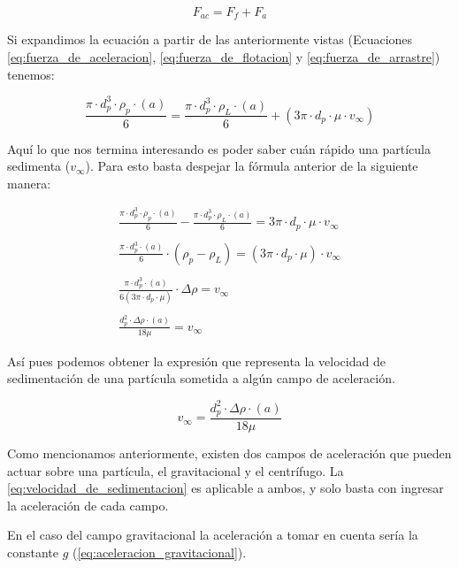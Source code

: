 \documentclass{AsignaturaResumen}
\begin{document}
\begin{equation}\label{eq:ley_de_stokes}
    F_{ac} = F_{f} + F_{a}
\end{equation}

Si expandimos la ecuación a partir de las anteriormente vistas (Ecuaciones \ref{eq:fuerza_de_aceleracion}, \ref{eq:fuerza_de_flotacion} y \ref{eq:fuerza_de_arrastre}) tenemos:

\begin{equation}\label{eq:ley_de_stokes_expandida}
    \frac{\pi \cdot d_{p}^{3}\cdot\rho_{p}\cdot(a)}{6} = \frac{\pi\cdot d_{p}^{3} \cdot\rho_{L}\cdot(a)}{6} + (3\pi\cdot d_{p}\cdot\mu\cdot v_{\infty})
\end{equation}

Aquí lo que nos termina interesando es poder saber cuán rápido una partícula sedimenta ($v_{\infty}$). Para esto basta despejar la fórmula anterior de la siguiente manera:

\begin{gather*}
    \frac{\pi\cdot d_{p}^{3}\cdot\rho_{p}\cdot(a)}{6} - \frac{\pi\cdot d_{p}^{3}\cdot\rho_{L}\cdot(a)}{6} = 3\pi\cdot d_{p} \cdot\mu\cdot v_{\infty}
    \\\\
    \frac{\pi\cdot d_{p}^{3}\cdot(a)}{6} \cdot (\rho_{p}-\rho_{L}) = (3\pi\cdot d_{p}\cdot\mu)\cdot v_{\infty}
    \\\\
    \frac{\pi\cdot d_{p}^{3}\cdot(a)}{6(3\pi\cdot d_{p}\cdot\mu)} \cdot \Delta\rho =  v_{\infty}
    \\\\
    \frac{d_{p}^{2}\cdot\Delta\rho\cdot(a)}{18\mu} = v_{\infty}
\end{gather*}

Así pues podemos obtener la expresión que representa la velocidad de sedimentación de una partícula sometida a algún campo de aceleración.

\begin{equation}\label{eq:velocidad_de_sedimentacion}
    v_{\infty} = \frac{d_{p}^{2}\cdot\Delta\rho\cdot(a)}{18\mu}
\end{equation}

Como mencionamos anteriormente, existen dos campos de aceleración que pueden actuar sobre una partícula, el gravitacional y el centrífugo. La \autoref{eq:velocidad_de_sedimentacion} es aplicable a ambos, y solo basta con ingresar la aceleración de cada campo.

En el caso del campo gravitacional la aceleración a tomar en cuenta sería la constante $g$ (\autoref{eq:aceleracion_gravitacional}).
\end{document}
